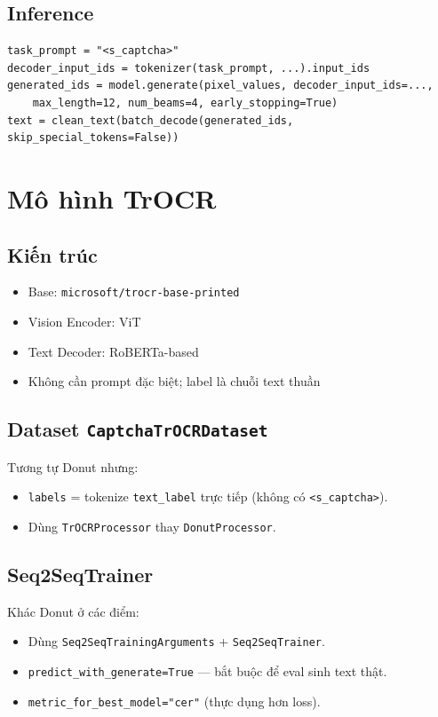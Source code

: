 \documentclass[a4paper,12pt]{report}
\begin{document}
\section{Inference}
\begin{lstlisting}
task_prompt = "<s_captcha>"
decoder_input_ids = tokenizer(task_prompt, ...).input_ids
generated_ids = model.generate(pixel_values, decoder_input_ids=...,
    max_length=12, num_beams=4, early_stopping=True)
text = clean_text(batch_decode(generated_ids, skip_special_tokens=False))
\end{lstlisting}

\chapter{Mô hình TrOCR}

\section{Kiến trúc}
\begin{itemize}[leftmargin=*]
  \item Base: \texttt{microsoft/trocr-base-printed}
  \item Vision Encoder: ViT
  \item Text Decoder: RoBERTa-based
  \item Không cần prompt đặc biệt; label là chuỗi text thuần
\end{itemize}

\section{Dataset \texttt{CaptchaTrOCRDataset}}
Tương tự Donut nhưng:
\begin{itemize}[leftmargin=*]
  \item \texttt{labels} = tokenize \texttt{text\_label} trực tiếp (không có \texttt{<s\_captcha>}).
  \item Dùng \texttt{TrOCRProcessor} thay \texttt{DonutProcessor}.
\end{itemize}

\section{Seq2SeqTrainer}
Khác Donut ở các điểm:
\begin{itemize}[leftmargin=*]
  \item Dùng \texttt{Seq2SeqTrainingArguments} + \texttt{Seq2SeqTrainer}.
  \item \texttt{predict\_with\_generate=True} --- bắt buộc để eval sinh text thật.
  \item \texttt{metric\_for\_best\_model="cer"} (thực dụng hơn loss).
\end{itemize}
\end{document}
